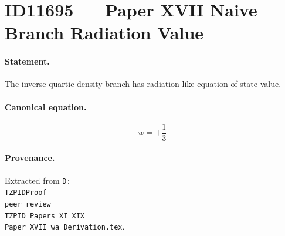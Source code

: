 \section*{ID11695 --- Paper XVII Naive Branch Radiation Value}

\paragraph{Statement.}
The inverse-quartic density branch has radiation-like equation-of-state value.

\paragraph{Canonical equation.}
\[
w=+\frac{1}{3}
\]

\paragraph{Provenance.}
Extracted from \texttt{D:\\TZPIDProof\\peer\_review\\TZPID\_Papers\_XI\_XIX\\Paper\_XVII\_wa\_Derivation.tex}.

